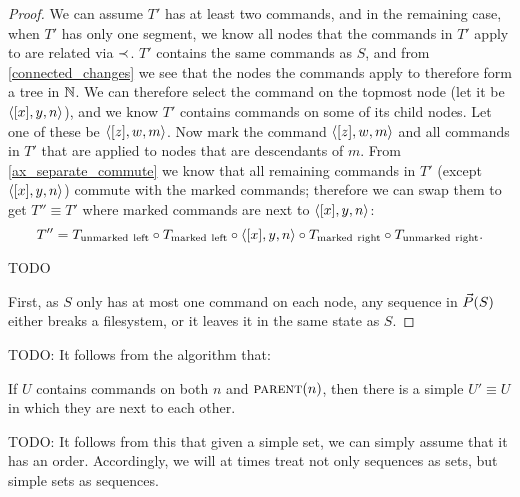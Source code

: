 \begin{proof}
We can assume $T'$ has at least two commands,
and in the remaining case, when $T'$ has only one segment,
we know all nodes that the commands in $T'$ apply to
are related via $\prec$.
$T'$ contains the same commands as $S$, and
from \cref{connected_changes} we see that the nodes the commands apply to therefore form a tree in $\mathbb{N}$.
We can therefore select the command on the topmost node (let it be $\langle{[x],y,n}\rangle$),
and we know $T'$ contains commands on some of its child nodes.
Let one of these be $\langle{[z],w,m}\rangle$.
Now mark the command $\langle{[z],w,m}\rangle$ and all commands in $T'$ that are applied to nodes that are descendants of $m$.
From \cref{ax_separate_commute} we know that all remaining commands in $T'$ (except $\langle{[x],y,n}\rangle$)
commute with the marked commands; therefore we can swap them to get $T''\equiv T'$
where marked commands are next to $\langle{[x],y,n}\rangle$:
\[ T'' = T_\mathrm{unmarked\ left} \circ T_\mathrm{marked\ left} \circ \langle{[x],y,n}\rangle \circ T_\mathrm{marked\ right} \circ T_\mathrm{unmarked\ right}. \]


TODO




First, as $S$ only has at most one command on each node,
any sequence in $\vec{P}({S})$ either breaks a filesystem,
or it leaves it in the same state as $S$.
\end{proof}






TODO:
It follows from the algorithm that:
\begin{mycor}\label{lemma:neighbor}
If $U$ contains commands on both $n$ and $\text{\normalfont\scshape{parent}}(n)$, then
there is a simple $U'\equiv U$ in which they are next to each other.
\end{mycor}


TODO:
It follows from this that given a simple set,
we can simply assume that it has an order.
Accordingly, we will at times treat not only sequences as sets,
but simple sets as sequences.


